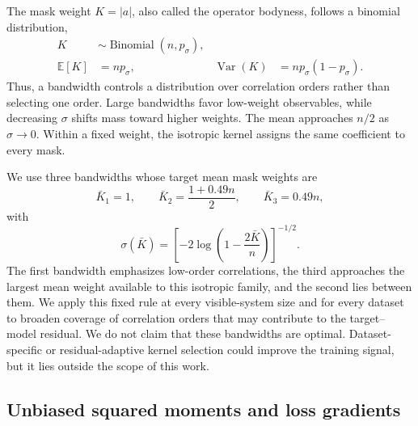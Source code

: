 \documentclass[pra,aps,10pt,twocolumn,floatfix,superscriptaddress,
notitlepage,longbibliography]{revtex4-2}
\newcommand{\E}{\mathbb{E}}
\begin{document}
The mask weight $K=|a|$, also called the operator bodyness, follows a binomial distribution,
\begin{equation}
    \begin{aligned}
        K&\sim\operatorname{Binomial}(n,p_\sigma),\\
        \E[K]&=np_\sigma,
        &\operatorname{Var}(K)&=np_\sigma(1-p_\sigma).
    \end{aligned}
    \label{eq:mmd-bodyness-distribution}
\end{equation}
Thus, a bandwidth controls a distribution over correlation orders rather than selecting one order. Large bandwidths favor low-weight observables, while decreasing $\sigma$ shifts mass toward higher weights. The mean approaches $n/2$ as $\sigma\rightarrow0$. Within a fixed weight, the isotropic kernel assigns the same coefficient to every mask.

We use three bandwidths whose target mean mask weights are
\begin{equation}
    \bar K_1=1,
    \qquad
    \bar K_2=\frac{1+0.49n}{2},
    \qquad
    \bar K_3=0.49n,
    \label{eq:mmd-target-bodyness}
\end{equation}
with
\begin{equation}
    \sigma(\bar K)=
    \left[-2\log\!\left(1-\frac{2\bar K}{n}\right)\right]^{-1/2}.
    \label{eq:mmd-bodyness-to-sigma}
\end{equation}
The first bandwidth emphasizes low-order correlations, the third approaches the largest mean weight available to this isotropic family, and the second lies between them. We apply this fixed rule at every visible-system size and for every dataset to broaden coverage of correlation orders that may contribute to the target--model residual. We do not claim that these bandwidths are optimal. Dataset-specific or residual-adaptive kernel selection could improve the training signal, but it lies outside the scope of this work.

\subsection{Unbiased squared moments and loss gradients}
\label{sec:unbiased-conditional-mmd}
\end{document}

